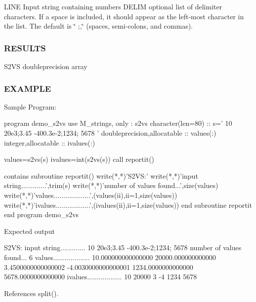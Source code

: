 L\+I\+NE Input string containing numbers D\+E\+L\+IM optional list of delimiter characters. If a space is included, it should appear as the left-\/most character in the list. The default is \char`\"{} ;,\char`\"{} (spaces, semi-\/colons, and commas). \subsubsection*{R\+E\+S\+U\+L\+TS}

S2\+VS doubleprecision array

\subsubsection*{E\+X\+A\+M\+P\+LE}

\begin{DoxyVerb} Sample Program:

  program demo_s2vs
  use M_strings, only : s2vs
  character(len=80)           :: s=' 10 20e3;3.45 -400.3e-2;1234; 5678 '
  doubleprecision,allocatable :: values(:)
  integer,allocatable         :: ivalues(:)

  values=s2vs(s)
  ivalues=int(s2vs(s))
  call reportit()

  contains
    subroutine reportit()
      write(*,*)'S2VS:'
      write(*,*)'input string.............',trim(s)
      write(*,*)'number of values found...',size(values)
      write(*,*)'values...................',(values(ii),ii=1,size(values))
      write(*,*)'ivalues..................',(ivalues(ii),ii=1,size(values))
    end subroutine reportit
  end program demo_s2vs

Expected output

 S2VS:
 input string............. 10 20e3;3.45 -400.3e-2;1234; 5678
 number of values found... 6
 values................... 10.000000000000000  20000.000000000000 3.4500000000000002
 -4.0030000000000001       1234.0000000000000  5678.0000000000000
 ivalues.................. 10  20000  3  -4 1234 5678 \end{DoxyVerb}
 

References split().

